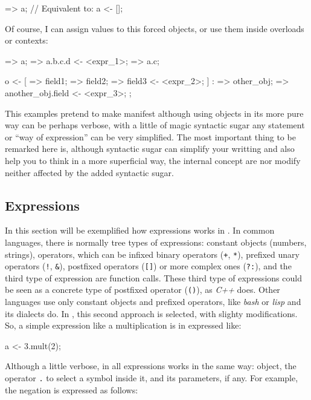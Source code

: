 \documentclass{article}
\begin{document}
\begin{faupp2}
  => a; // Equivalent to:
  a <- [];
\end{faupp2}

Of course, I can assign values to this forced objects, or use them inside
overloads or contexts:

\begin{faupp2}
  => a;
  => a.b.c.d <- <expr_1>;
  => a.c;

  o <- [
         => field1;
         => field2;
         => field3 <- <expr_2>;
       ] : {
         => other_obj;
         => another_obj.field <- <expr_3>;
       };
\end{faupp2}

This examples pretend to make manifest although using objects in its more pure
way can be perhaps verbose, with a little of magic syntactic sugar any statement
or ``way of expression'' can be very simplified. The most important thing to be
remarked here is, although syntactic sugar can simplify your writting and also
help you to think in a more superficial way, the internal concept are nor modify
neither affected by the added syntactic sugar.

\subsection{Expressions}
In this section will be exemplified how expressions works in \faupp. In common
languages, there is normally tree types of expressions: constant objects
(numbers, strings), operators, which can be infixed binary operators
(\texttt{+}, \texttt{*}), prefixed unary operators (\texttt{!}, \texttt{\&}),
postfixed operators (\texttt{[]}) or more complex ones (\texttt{?:}), and the
third type of expression are function calls. These third type of expressions
could be seen as a concrete type of postfixed operator (\texttt{()}), as
\textit{C++} does. Other languages use only constant objects and prefixed
operators, like \textit{bash} or \textit{lisp} and its dialects do. In \faupp, this
second approach is selected, with slighty modifications. So, a simple expression
like a multiplication is in \faupp expressed like:

\begin{faupp2}
  a <- 3.mult(2);
\end{faupp2}

Although a little verbose, in \faupp all expressions works in the same way:
object, the operator \texttt{.} to select a symbol inside it, and its
parameters, if any. For example, the negation is expressed as follows:
\end{document}
